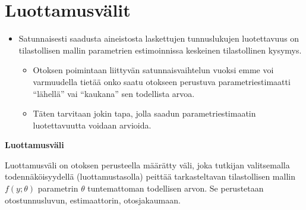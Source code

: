 \documentclass[
]{book}
\providecommand{\tightlist}{%
  \setlength{\itemsep}{0pt}\setlength{\parskip}{0pt}}
\begin{document}
\hypertarget{alaluku91}{%
\section{Luottamusvälit}\label{alaluku91}}

\begin{itemize}
\tightlist
\item
  Satunnaisesti saadusta aineistosta laskettujen tunnuslukujen luotettavuus on tilastollisen mallin parametrien estimoinnissa keskeinen tilastollinen kysymys.

  \begin{itemize}
  \tightlist
  \item
    Otoksen poimintaan liittyvän satunnaisvaihtelun vuoksi emme voi varmuudella tietää onko saatu otokseen perustuva parametriestimaatti ``lähellä'' vai ``kaukana'' sen todellista arvoa.
  \item
    Täten tarvitaan jokin tapa, jolla saadun parametriestimaatin luotettavuutta voidaan arvioida.
  \end{itemize}
\end{itemize}

\begin{defblock}{}
\textbf{Luottamusväli}

Luottamusväli on otoksen perusteella määrätty väli, joka tutkijan valitsemalla todennäköisyydellä (luottamustasolla) peittää tarkasteltavan tilastollisen mallin \(f(y;\theta)\) parametrin \(\theta\) tuntemattoman todellisen arvon. Se perustetaan otostunnusluvun, estimaattorin, otosjakaumaan.

\end{defblock}
\end{document}
